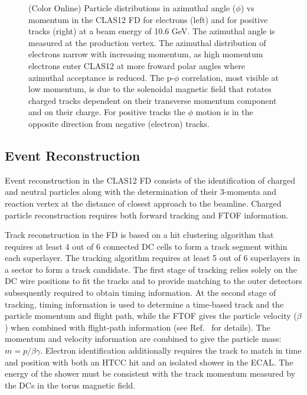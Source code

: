 \documentclass[final,3p,twocolumn]{elsarticle}
\begin{document}
\begin{figure}[t!]
\caption{(Color Online) Particle distributions in azimuthal angle ($\phi$) vs momentum in the CLAS12 FD for electrons (left) and for positive
 tracks (right) at a beam energy of 10.6 GeV.  The azimuthal angle is measured at the production vertex. The azimuthal distribution of electrons 
 narrow with increasing momentum, as high momentum electrons enter CLAS12 at more froward polar angles where azimuthal acceptance is
 reduced. The p-$\phi$ correlation, most visible at low momentum, is due to
  the solenoidal magnetic field that rotates charged tracks dependent on their transverse momentum component
  and on their charge. For positive tracks the $\phi$ motion is in the opposite direction from negative (electron) tracks.} 
\label{neg-pos}
\end{figure}

\subsection{Event Reconstruction} 

Event reconstruction in the CLAS12 FD consists of the identification of charged and neutral particles along with the 
determination of their 3-momenta and reaction vertex at the distance of closest approach to the beamline.
Charged particle reconstruction requires both forward tracking and FTOF information. 

Track reconstruction in the FD is based on a hit clustering algorithm that requires at least 4 out of 6 connected DC
cells to form a track segment within each superlayer.  The tracking algorithm requires at least 5 out of 6 superlayers
in a sector to form a track candidate. The first stage of tracking relies solely on the DC wire positions to fit the
tracks and to provide matching to the outer detectors subsequently required to obtain timing information. At the
second stage of tracking, timing information is used to determine a time-based track and the particle momentum
and flight path, while the FTOF gives the particle velocity ($\beta$) when combined with flight-path information
(see Ref.~\cite{Software} for details). The momentum and velocity information are combined to give the particle
mass: $m = p/\beta\gamma$. Electron identification additionally requires the track to match in time and position
with both an HTCC hit and an isolated shower in the ECAL. The energy of the shower must be consistent with the
track momentum measured by the DCs in the torus magnetic field. 
\end{document}
